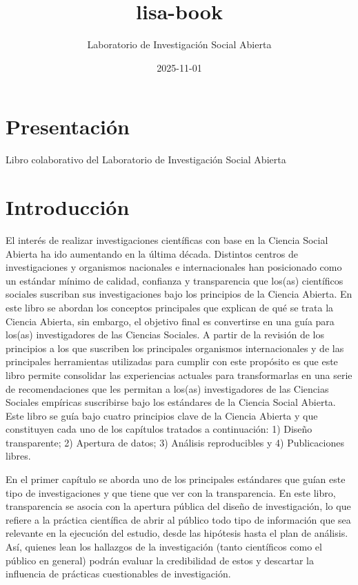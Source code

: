 \documentclass[
  spanish,
  letterpaper,
  DIV=11,
  numbers=noendperiod]{scrreprt}
\title{lisa-book}
\author{Laboratorio de Investigación Social Abierta}
\date{2025-11-01}
\renewcommand*\contentsname{Tabla de contenidos}
\newcommand\contentsname{Tabla de contenidos}
\begin{document}
\maketitle

\renewcommand*\contentsname{Tabla de contenidos}
{
\hypersetup{linkcolor=}
\setcounter{tocdepth}{2}
\tableofcontents
}


\chapter*{Presentación}\label{presentaciuxf3n}


Libro colaborativo del Laboratorio de Investigación Social Abierta


\chapter{Introducción}\label{introducciuxf3n}

El interés de realizar investigaciones científicas con base en la
Ciencia Social Abierta ha ido aumentando en la última década. Distintos
centros de investigaciones y organismos nacionales e internacionales han
posicionado como un estándar mínimo de calidad, confianza y
transparencia que los(as) científicos sociales suscriban sus
investigaciones bajo los principios de la Ciencia Abierta. En este libro
se abordan los conceptos principales que explican de qué se trata la
Ciencia Abierta, sin embargo, el objetivo final es convertirse en una
guía para los(as) investigadores de las Ciencias Sociales. A partir de
la revisión de los principios a los que suscriben los principales
organismos internacionales y de las principales herramientas utilizadas
para cumplir con este propósito es que este libro permite consolidar las
experiencias actuales para transformarlas en una serie de
recomendaciones que les permitan a los(as) investigadores de las
Ciencias Sociales empíricas suscribirse bajo los estándares de la
Ciencia Social Abierta. Este libro se guía bajo cuatro principios clave
de la Ciencia Abierta y que constituyen cada uno de los capítulos
tratados a continuación: 1) Diseño transparente; 2) Apertura de datos;
3) Análisis reproducibles y 4) Publicaciones libres.

En el primer capítulo se aborda uno de los principales estándares que
guían este tipo de investigaciones y que tiene que ver con la
transparencia. En este libro, transparencia se asocia con la apertura
pública del diseño de investigación, lo que refiere a la práctica
científica de abrir al público todo tipo de información que sea
relevante en la ejecución del estudio, desde las hipótesis hasta el plan
de análisis. Así, quienes lean los hallazgos de la investigación (tanto
científicos como el público en general) podrán evaluar la credibilidad
de estos y descartar la influencia de prácticas cuestionables de
investigación.
\end{document}
